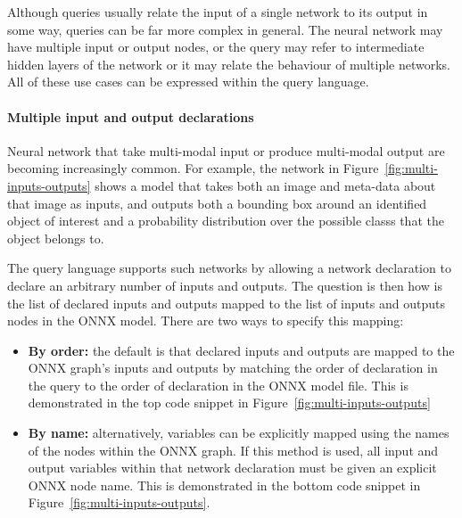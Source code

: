 Although queries usually relate the input of a single network to its output in some way, queries can be far more complex in general. The neural network may have multiple input or output nodes, or the query may refer to intermediate hidden layers of the network or it may relate the behaviour of multiple networks. All of these use cases can be expressed within the query language.

\paragraph{Multiple input and output declarations}

Neural network that take multi-modal input or produce multi-modal output are becoming increasingly common. For example, the network in Figure~\ref{fig:multi-inputs-outputs} shows a model that takes both an image and meta-data about that image as inputs, and outputs both a bounding box around an identified object of interest and a probability distribution over the possible classs that the object belongs to. 

The query language supports such networks by allowing a network declaration to declare an arbitrary number of inputs and outputs. The question is then how is the list of declared inputs and outputs mapped to the list of inputs and outputs nodes in the ONNX model. There are two ways to specify this mapping: 
\begin{itemize}
    \item \textbf{By order:} the default is that declared inputs and outputs are mapped to the ONNX graph's inputs and outputs by matching the order of declaration in the query to the order of declaration in the ONNX model file. This is demonstrated in the top code snippet in Figure~\ref{fig:multi-inputs-outputs}
    \item \textbf{By name:} alternatively, variables can be explicitly mapped using the names of the nodes within the ONNX graph. If this method is used, all input and output variables within that network declaration must be given an explicit ONNX node name. This is demonstrated in the bottom code snippet in Figure~\ref{fig:multi-inputs-outputs}.
\end{itemize}

